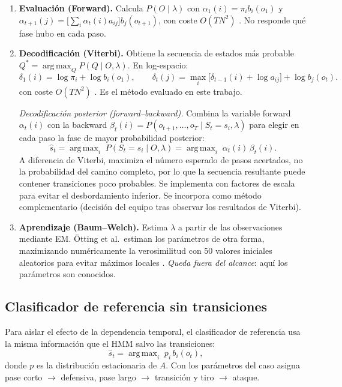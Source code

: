 \documentclass[11pt,a4paper]{article}
\DeclareMathOperator*{\argmax}{arg\,max}
\begin{document}
\begin{enumerate}
\item \textbf{Evaluación (Forward).} Calcula $P(O\mid\lambda)$ con
$\alpha_1(i)=\pi_i b_i(o_1)$ y
$\alpha_{t+1}(j)=\big[\sum_i\alpha_t(i)a_{ij}\big]b_j(o_{t+1})$,
con coste $O(TN^2)$ \cite[p.~14]{otting2023}. No responde qué fase hubo en cada
paso.
\item \textbf{Decodificación (Viterbi).} Obtiene la secuencia de estados más
probable $Q^*=\argmax_Q P(Q\mid O,\lambda)$. En log-espacio:
\begin{equation}
\delta_1(i)=\log\pi_i+\log b_i(o_1),\qquad
\delta_t(j)=\max_i\big[\delta_{t-1}(i)+\log a_{ij}\big]+\log b_j(o_t).
\end{equation}
con coste $O(TN^2)$ \cite[p.~22]{otting2023}. Es el método evaluado en este
trabajo.

\emph{Decodificación posterior (forward--backward).} Combina la variable forward
$\alpha_t(i)$ con la backward $\beta_t(i)=P(o_{t+1},\dots,o_T\mid S_t=s_i,\lambda)$
para elegir en cada paso la fase de mayor probabilidad posterior:
\begin{equation}
\hat s_t=\argmax_i\;P(S_t=s_i\mid O,\lambda)=\argmax_i\;\alpha_t(i)\,\beta_t(i).
\end{equation}
A diferencia de Viterbi, maximiza el número esperado de pasos acertados, no la
probabilidad del camino completo, por lo que la secuencia resultante puede
contener transiciones poco probables. Se implementa con factores de escala para
evitar el desbordamiento inferior. Se incorpora como método complementario
(decisión del equipo tras observar los resultados de Viterbi).
\item \textbf{Aprendizaje (Baum--Welch).} Estima $\lambda$ a partir de las
observaciones mediante EM. Ötting et al.\ estiman los parámetros de otra forma,
maximizando numéricamente la verosimilitud con 50 valores iniciales aleatorios
para evitar máximos locales \cite[pp.~14--15]{otting2023}. \emph{Queda fuera
del alcance}: aquí los parámetros son conocidos.
\end{enumerate}

\subsection{Clasificador de referencia sin transiciones}
Para aislar el efecto de la dependencia temporal, el clasificador de referencia
usa la misma información que el HMM salvo las transiciones:
\begin{equation}
\hat s_t=\argmax_i\; p_i\, b_i(o_t),
\end{equation}
donde $p$ es la distribución estacionaria de $A$. Con los parámetros del caso
asigna pase corto $\to$ defensiva, pase largo $\to$ transición y tiro $\to$
ataque.
\end{document}
